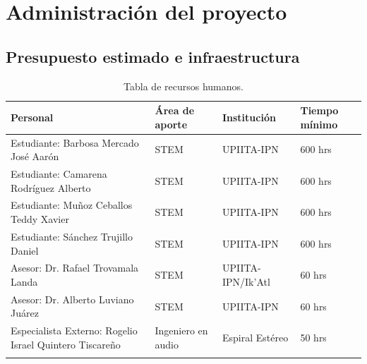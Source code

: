 \documentclass[letterpaper,12pt,oneside]{article}
\begin{document}






 












%


\section*{Administración del proyecto}
\subsection*{Presupuesto estimado e infraestructura}
\begin{center}
\footnotesize
    \begin{longtable}[!htb]{| m{15em} | m{6em} | m{6em}| m{6em}|}
    \hline
    \textbf{Personal}& \textbf{\'Area de aporte} & \textbf{Instituci\'on} & \textbf{Tiempo m\'inimo}\\
    \hline\hline
    Estudiante: Barbosa Mercado José Aarón & STEM & UPIITA-IPN & 600 hrs\\
    \hline
    Estudiante: Camarena Rodríguez Alberto & STEM & UPIITA-IPN & 600 hrs\\
    \hline
    Estudiante: Muñoz Ceballos Teddy Xavier & STEM & UPIITA-IPN & 600 hrs\\
    \hline
    Estudiante: Sánchez Trujillo Daniel & STEM & UPIITA-IPN & 600 hrs\\
    \hline
    Asesor: Dr. Rafael Trovamala Landa & STEM & UPIITA-IPN/Ik'Atl & 60 hrs\\
    \hline
    Asesor: Dr. Alberto Luviano Juárez & STEM & UPIITA-IPN & 60 hrs\\
    \hline
    Especialista Externo: Rogelio Israel Quintero Tiscareño & Ingeniero en audio & Espiral Est\'ereo & 50 hrs\\
    \hline

    \caption{Tabla de recursos humanos.}
    \label{tab:RH}
    \end{longtable}
\end{center}
\end{document}
